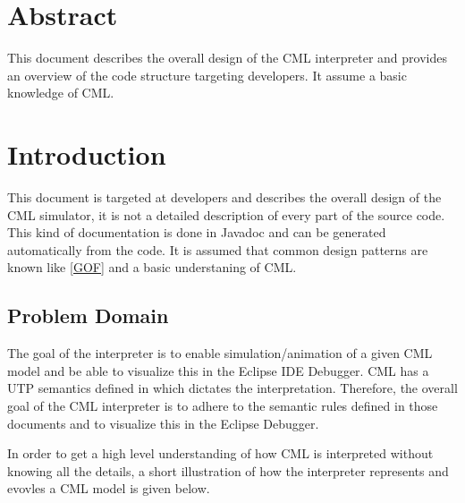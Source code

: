 \documentclass[a4paper, 10pt]{include/compassreport}   %
\begin{document}
\maketitle


\section*{Abstract}
\label{sec:abstract}

This document describes the overall design of the CML
interpreter and provides an overview of the code structure
targeting developers. It assume a basic knowledge of CML.

\newpage

\tableofcontents
\newpage

\section{Introduction}\label{sec:introduction}
This document is targeted at developers and describes the overall
design of the CML simulator, it is not a detailed description of every
part of the source code. This kind of documentation is done in Javadoc
and can be generated automatically from the code. It is assumed that
common design patterns are known like \ref{GOF} and a basic
understaning of CML.

\subsection{Problem Domain}\label{sec:problem_domain}
The goal of the interpreter is to enable simulation/animation of a
given CML \cite{cml syntax} model and be able to visualize this in the
Eclipse IDE Debugger. CML has a UTP semantics defined in \cite{cml
semantics} which dictates the interpretation. Therefore, the
overall goal of the CML interpreter is to adhere to the semantic
rules defined in those documents and to visualize this in the
Eclipse Debugger.

In order to get a high level understanding of how CML is interpreted
without knowing all the details, a short illustration of how the interpreter
represents and evovles a CML model is given below. 
\end{document}

